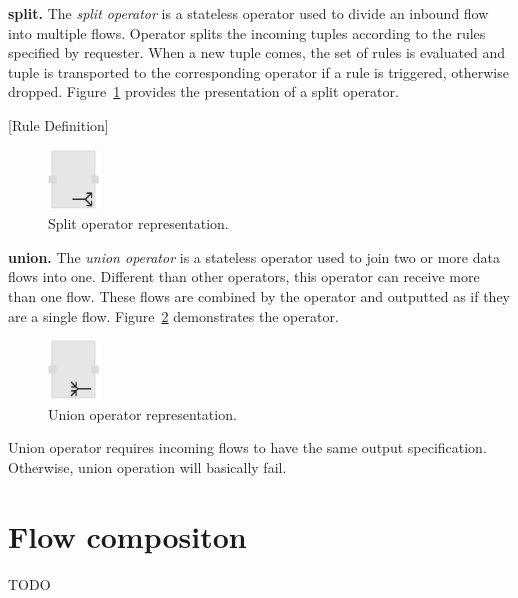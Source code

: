 \textbf{split.}
The \textit{split operator} is a stateless operator used to divide an inbound flow 
into multiple flows. Operator splits the incoming tuples according to the rules 
specified by requester. When a new tuple comes, the set of rules is evaluated 
and tuple is transported to the corresponding operator if a rule is triggered, otherwise 
dropped. Figure~\ref{fig:split operator} provides the presentation of a split operator.

[Rule Definition]

\begin{figure}[ht]
	\centering
	\includegraphics[height=60px]{figures/SplitOperator.pdf}
	\caption{Split operator representation.}
	\label{fig:split operator}
\end{figure}

\textbf{union.}
The \textit{union operator} is a stateless operator used to join two or more data flows 
into one. Different than other operators, this operator can receive more than one flow. 
These flows are combined by the operator and outputted as if they are a single flow. 
Figure~\ref{fig:union operator} demonstrates the operator.

\begin{figure}[ht]
	\centering
	\includegraphics[height=60px]{figures/UnionOperator.pdf}
	\caption{Union operator representation.}
	\label{fig:union operator}
\end{figure}

Union operator requires incoming flows to have the same output specification. Otherwise, 
union operation will basically fail.

\section{Flow compositon}
\label{sec:flow comp}
TODO